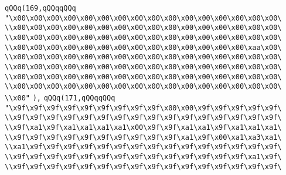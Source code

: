 \verb|qQQq(169,qQQqqQQq|\newline
\verb|"\x00\x00\x00\x00\x00\x00\x00\x00\x00\x00\x00\x00\x00\x00\x00\x00\|\newline
\verb|\\x00\x00\x00\x00\x00\x00\x00\x00\x00\x00\x00\x00\x00\x00\x00\x00\|\newline
\verb|\\x00\x00\x00\x00\x00\x00\x00\x00\x00\x00\x00\x00\x00\x00\x00\x00\|\newline
\verb|\\x00\x00\x00\x00\x00\x00\x00\x00\x00\x00\x00\x00\x00\x00\xaa\x00\|\newline
\verb|\\x00\x00\x00\x00\x00\x00\x00\x00\x00\x00\x00\x00\x00\x00\x00\x00\|\newline
\verb|\\x00\x00\x00\x00\x00\x00\x00\x00\x00\x00\x00\x00\x00\x00\x00\x00\|\newline
\verb|\\x00\x00\x00\x00\x00\x00\x00\x00\x00\x00\x00\x00\x00\x00\x00\x00\|\newline
\verb|\\x00\x00\x00\x00\x00\x00\x00\x00\x00\x00\x00\x00\x00\x00\x00\x00\|\newline
\verb|\\x00"|\newline
\verb|),|\newline
\verb|qQQq(171,qQQqqQQq|\newline
\verb|"\x9f\x9f\x9f\x9f\x9f\x9f\x9f\x9f\x9f\x00\x00\x9f\x9f\x9f\x9f\x9f\|\newline
\verb|\\x9f\x9f\x9f\x9f\x9f\x9f\x9f\x9f\x9f\x9f\x9f\x9f\x9f\x9f\x9f\x9f\|\newline
\verb|\\x9f\xa1\x9f\xa1\xa1\xa1\xa1\x00\x9f\x9f\xa1\xa1\x9f\xa1\xa1\xa1\|\newline
\verb|\\x9f\x9f\x9f\x9f\x9f\x9f\x9f\x9f\x9f\x9f\xa1\x9f\x00\xa1\xa3\xa1\|\newline
\verb|\\xa1\x9f\x9f\x9f\x9f\x9f\x9f\x9f\x9f\x9f\x9f\x9f\x9f\x9f\x9f\x9f\|\newline
\verb|\\x9f\x9f\x9f\x9f\x9f\x9f\x9f\x9f\x9f\x9f\x9f\x9f\x9f\x9f\xa1\x9f\|\newline
\verb|\\x9f\x9f\x9f\x9f\x9f\x9f\x9f\x9f\x9f\x9f\x9f\x9f\x9f\x9f\x9f\x9f\|\newline
